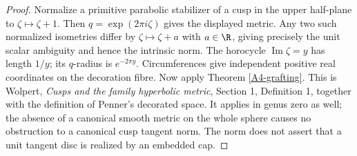 \begin{proof}
Normalize a primitive parabolic stabilizer of a cusp in the upper half-plane to $\zeta\mapsto\zeta+1$. Then $q=\exp(2\pi i\zeta)$ gives the displayed metric. Any two such normalized isometries differ by $\zeta\mapsto\zeta+a$ with $a\in\R$, giving precisely the unit scalar ambiguity and hence the intrinsic norm. The horocycle $\operatorname{Im}\zeta=y$ has length $1/y$; its $q$-radius is $e^{-2\pi y}$. Circumferences give independent positive real coordinates on the decoration fibre. Now apply Theorem \ref{A4-grafting}. This is Wolpert, \emph{Cusps and the family hyperbolic metric}, Section 1, Definition 1, together with the definition of Penner's decorated space. It applies in genus zero as well; the absence of a canonical smooth metric on the whole sphere causes no obstruction to a canonical cusp tangent norm. The norm does not assert that a unit tangent disc is realized by an embedded cap.
\end{proof}

